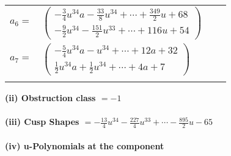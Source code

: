 \documentclass[1p]{elsarticle_modified}
\theoremstyle{definition}
\begin{document}
\begin{tabular}{m{7pt} m{180pt} m{7pt} m{180pt} }
\flushright $a_{6}=$&$\begin{pmatrix}-\frac{3}{4} u^{34} a-\frac{33}{8} u^{34}+\cdots+\frac{349}{2} u+68\\-\frac{9}{2} u^{34}-\frac{151}{2} u^{33}+\cdots+116 u+54\end{pmatrix}$ \\
\flushright $a_{7}=$&$\begin{pmatrix}-\frac{5}{4} u^{34} a- u^{34}+\cdots+12 a+32\\\frac{1}{2} u^{34} a+\frac{1}{2} u^{34}+\cdots+4 a+7\end{pmatrix}$\\&\end{tabular}
\flushleft \textbf{(ii) Obstruction class $= -1$}\\~\\
\flushleft \textbf{(iii) Cusp Shapes $= -\frac{13}{4} u^{34}-\frac{227}{4} u^{33}+\cdots-\frac{895}{2} u-65$}\\~\\
\newpage\renewcommand{\arraystretch}{1}
\flushleft \textbf{(iv) u-Polynomials at the component}\newline \\
\end{document}
